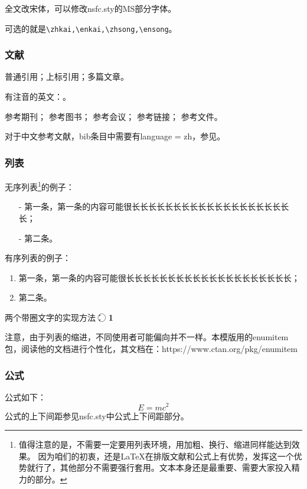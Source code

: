 全文改宋体，可以修改nsfc.sty的MS部分字体。

可选的就是\verb|\zhkai,\enkai,\zhsong,\ensong|。

\subsubsection{文献}
普通引用\cite{test}；上标引用；多篇文章。

有注音的英文：\cite{test}。

参考期刊\cite{test}；
参考图书\cite{test2}；
参考会议\cite{test5}；
参考链接\cite{test4}；
参考文件\cite{test6}。

对于中文参考文献，bib条目中需要有language = {zh}，参见\cite{test2}。
\subsubsection{列表}
无序列表\footnote{值得注意的是，不需要一定要用列表环境，用加粗、换行、缩进同样能达到效果。
	因为咱们的初衷，还是LaTeX在排版文献和公式上有优势，发挥这一个优势就行了，其他部分不需要强行套用。文本本身还是最重要、需要大家投入精力的部分。}的例子：
\begin{itemize}[left= 50pt]
	\item[-] 第一条，第一条的内容可能很长长长长长长长长长长长长长长长长长长长长；
	\item[-] 第二条。
\end{itemize}

有序列表的例子：
\begin{enumerate}[left= 50pt]
	\item 第一条，第一条的内容可能很长长长长长长长长长长长长长长长长长长长长；
	\item 第二条。
\end{enumerate}

两个带圈文字的实现方法：
\textcircled{\raisebox{-0.8pt}{1}}
\textcircled{\textbf{\small 1}}

注意，由于列表的缩进，不同使用者可能偏向并不一样。本模版用的enumitem包，阅读他的文档进行个性化，其文档在：https://www.ctan.org/pkg/enumitem


\subsubsection{公式}

公式如下：
\begin{equation}
	E=mc^2
\end{equation}
公式的上下间距参见nsfc.sty中公式上下间距部分。

